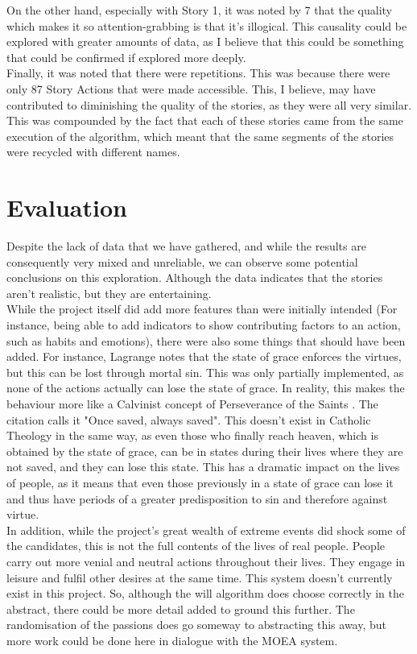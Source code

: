 \documentclass[12pt]{article}
\begin{document}
On the other hand, especially with Story 1, it was noted by 7 that the quality which makes it so attention-grabbing is that it's illogical. This causality could be explored with greater amounts of data, as I believe that this could be something that could be confirmed if explored more deeply. \\

Finally, it was noted that there were repetitions. This was because there were only 87 Story Actions that were made accessible. This, I believe, may have contributed to diminishing the quality of the stories, as they were all very similar. This was compounded by the fact that each of these stories came from the same execution of the algorithm, which meant that the same segments of the stories were recycled with different names. 

\section{Evaluation}
Despite the lack of data that we have gathered, and while the results are consequently very mixed and unreliable, we can observe some potential conclusions on this exploration. Although the data indicates that the stories aren't realistic, but they are entertaining. \\

While the project itself did add more features than were initially intended (For instance, being able to add indicators to show contributing factors to an action, such as habits and emotions), there were also some things that should have been added. For instance, Lagrange notes that the state of grace enforces the virtues, but this can be lost through mortal sin. This was only partially implemented, as none of the actions actually can lose the state of grace. In reality, this makes the behaviour more like a Calvinist concept of Perseverance of the Saints \cite{TULIPorT24:online}. The citation calls it "Once saved, always saved". This doesn't exist in Catholic Theology in the same way, as even those who finally reach heaven, which is obtained by the state of grace, can be in states during their lives where they are not saved, and they can lose this state. This has a dramatic impact on the lives of people, as it means that even those previously in a state of grace can lose it and thus have periods of a greater predisposition to sin and therefore against virtue. \\

In addition, while the project's great wealth of extreme events did shock some of the candidates, this is not the full contents of the lives of real people. People carry out more venial and neutral actions throughout their lives. They engage in leisure and fulfil other desires at the same time. This system doesn't currently exist in this project. So, although the will algorithm does choose correctly in the abstract, there could be more detail added to ground this further. The randomisation of the passions does go someway to abstracting this away, but more work could be done here in dialogue with the MOEA system. \\
\end{document}
